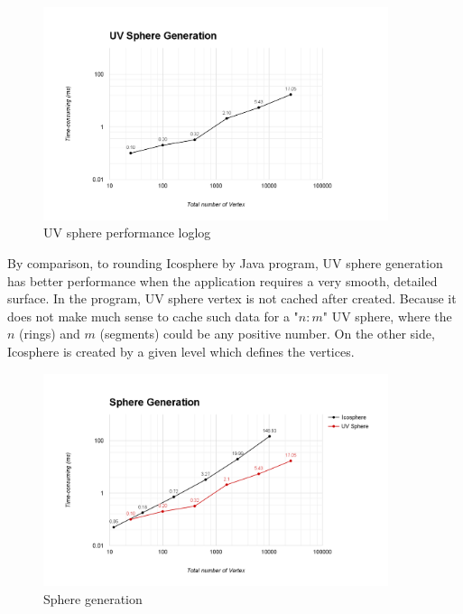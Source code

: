 \begin{figure}[H]
	\caption{UV sphere performance loglog}
	\label{fig:uv-sphere-performance-loglog}
	\centering
	\includegraphics[width=0.9\textwidth, keepaspectratio]{Figures/uv-sphere-performance-loglog.png}
	\decoRule
\end{figure}

By comparison, to rounding Icosphere by Java program, UV sphere generation has better performance when the application requires a very smooth, detailed surface. In the program, UV sphere vertex is not cached after created. Because it does not make much sense to cache such data for a "$n:m$" UV sphere, where the $n$ (rings) and $m$ (segments) could be any positive number. On the other side, Icosphere is created by a given level which defines the vertices.

\begin{figure}[H]
	\caption{Sphere generation}
	\label{fig:icosphere-and-uv-sphere}
	\centering
	\includegraphics[width=0.9\textwidth, keepaspectratio]{Figures/icosphere-and-uv-sphere.png}
	\decoRule
\end{figure}


